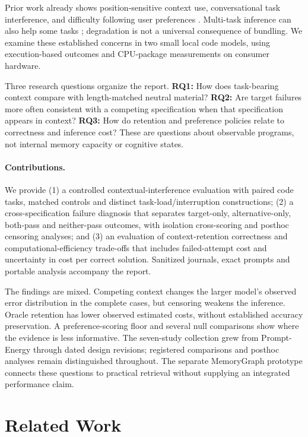 \documentclass[10pt,a4paper,twocolumn]{article}
\begin{document}
Prior work already shows position-sensitive context use, conversational task
interference, and difficulty following user preferences
\citep{lost,interference,prefeval}. Multi-task inference can also help some
tasks \citep{multitask}; degradation is not a universal consequence of bundling.
We examine these established concerns in two small local code models, using
execution-based outcomes and CPU-package measurements on consumer hardware.

Three research questions organize the report. \textbf{RQ1:} How does task-bearing
context compare with length-matched neutral material? \textbf{RQ2:} Are target
failures more often consistent with a competing specification when that
specification appears in context? \textbf{RQ3:} How do retention and preference
policies relate to correctness and inference cost? These are questions about
observable programs, not internal memory capacity or cognitive states.

\paragraph{Contributions.}
We provide (1) a controlled contextual-interference evaluation with paired
code tasks, matched controls and distinct task-load/interruption constructions;
(2) a cross-specification failure diagnosis that separates target-only,
alternative-only, both-pass and neither-pass outcomes, with isolation
cross-scoring and posthoc censoring analyses; and (3) an evaluation of
context-retention correctness and computational-efficiency trade-offs that
includes failed-attempt cost and uncertainty in cost per correct solution.
Sanitized journals, exact prompts and portable analysis accompany the report.

The findings are mixed. Competing context changes the larger model's observed
error distribution in the complete cases, but censoring weakens the inference.
Oracle retention has lower observed estimated costs, without established
accuracy preservation. A preference-scoring floor and several null comparisons
show where the evidence is less informative. The seven-study collection grew
from Prompt-Energy through dated design revisions; registered comparisons and
posthoc analyses remain distinguished throughout. The separate MemoryGraph
prototype connects these questions to practical retrieval without supplying
an integrated performance claim.

\section{Related Work}
\end{document}
